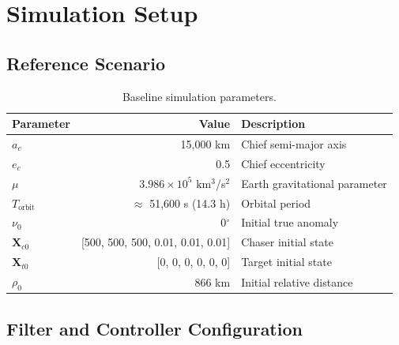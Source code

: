 \documentclass[preprint,3p,times]{elsarticle}
\begin{document}
\section{Simulation Setup}

\subsection{Reference Scenario}

\begin{table}[h]
\centering
\caption{Baseline simulation parameters.}
\label{tab:params}
\begin{tabular}{lrl}
\toprule
Parameter & Value & Description \\
\midrule
$a_c$ & 15,000 km & Chief semi-major axis \\
$e_c$ & 0.5 & Chief eccentricity \\
$\mu$ & $3.986 \times 10^5$ km$^3$/s$^2$ & Earth gravitational parameter \\
$T_{\text{orbit}}$ & $\approx$ 51,600 s (14.3 h) & Orbital period \\
$\nu_0$ & 0$^\circ$ & Initial true anomaly \\
$\mathbf{X}_{c0}$ & [500, 500, 500, 0.01, 0.01, 0.01] & Chaser initial state \\
$\mathbf{X}_{t0}$ & [0, 0, 0, 0, 0, 0] & Target initial state \\
$\rho_0$ & 866 km & Initial relative distance \\
\bottomrule
\end{tabular}
\end{table}

\subsection{Filter and Controller Configuration}
\end{document}
